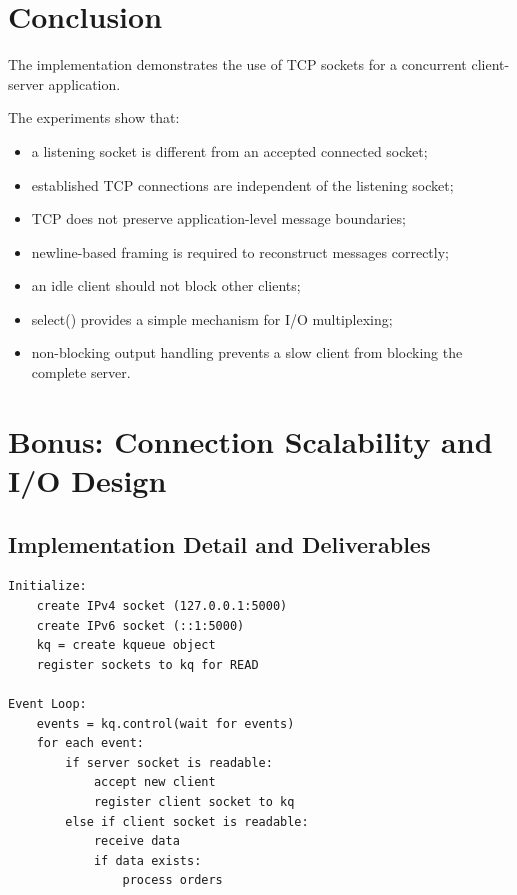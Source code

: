 \documentclass[11pt,a4paper]{article}
\begin{document}
\section{Conclusion}

The implementation demonstrates the use of TCP sockets for a concurrent
client-server application.

The experiments show that:

\begin{itemize}
    \item a listening socket is different from an accepted connected socket;
    \item established TCP connections are independent of the listening socket;
    \item TCP does not preserve application-level message boundaries;
    \item newline-based framing is required to reconstruct messages correctly;
    \item an idle client should not block other clients;
    \item {select()} provides a simple mechanism for I/O multiplexing;
    \item non-blocking output handling prevents a slow client from blocking
          the complete server.
\end{itemize}

\newpage
\section{Bonus: Connection Scalability and I/O Design}

\subsection{Implementation Detail and Deliverables}

\begin{lstlisting}[style=pseudocode]
Initialize:
    create IPv4 socket (127.0.0.1:5000)
    create IPv6 socket (::1:5000)
    kq = create kqueue object
    register sockets to kq for READ

Event Loop:
    events = kq.control(wait for events)
    for each event:
        if server socket is readable:
            accept new client
            register client socket to kq
        else if client socket is readable:
            receive data
            if data exists:
                process orders
\end{lstlisting}
\end{document}
